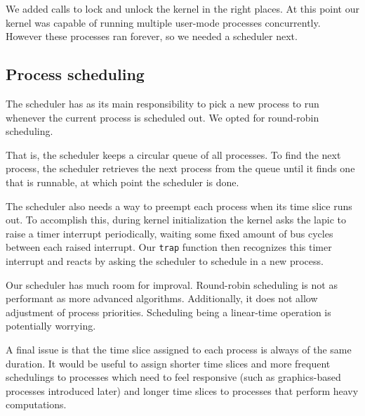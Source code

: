 \documentclass{article}
\begin{document}
We added calls to lock and unlock the kernel in the right places. At this
point our kernel was capable of running multiple user-mode processes
concurrently. However these processes ran forever, so we needed a scheduler
next.


\subsection{Process scheduling}
\label{sec:preempt}
The scheduler has as its main responsibility to pick a new process to run
whenever the current process is scheduled out. We opted for round-robin
scheduling.

That is, the scheduler keeps a circular queue of all processes. To find the
next process, the scheduler retrieves the next process from the queue until it
finds one that is runnable, at which point the scheduler is done.

The scheduler also needs a way to preempt each process when its time slice
runs out. To accomplish this, during kernel initialization the kernel asks the
\gls{lapic} to raise a timer interrupt periodically, waiting some fixed amount
of bus cycles between each raised interrupt. Our \texttt{trap} function then
recognizes this timer interrupt and reacts by asking the scheduler to schedule
in a new process.

Our scheduler has much room for improval. Round-robin scheduling is not as
performant as more advanced algorithms. Additionally, it does not allow
adjustment of process priorities. Scheduling being a linear-time operation is
potentially worrying. 

A final issue is that the time slice assigned to each process is always of the
same duration. It would be useful to assign shorter time slices and more
frequent schedulings to processes which need to feel responsive (such as
graphics-based processes introduced later) and longer time slices to processes
that perform heavy computations.
\end{document}
